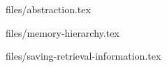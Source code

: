 \documentclass[12px]{article}
\begin{document}
    \nocite{*}
    
    
    \begin{titlepage}
        \vspace{1 cm}
        \contribute
    \end{titlepage}

    \newpage
    \tableofcontents

    \newpage
    \subject{انتزاع}{files/abstraction.tex}
    \subject{سلسه مراتب حافظه}{files/memory-hierarchy.tex}
    \subject{ذخیره‌سازی و بازیابی فایل}{files/saving-retrieval-information.tex}
\end{document}
